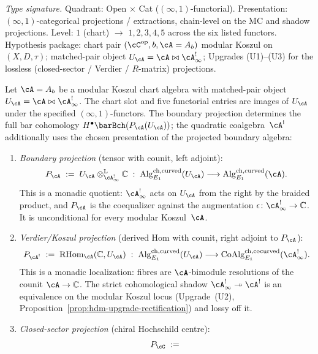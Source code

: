 \begin{theorem}
\label{thm:hdm-five-recovery-functors}
\emph{Type signature.} Quadrant: Open $\times$ Cat
($(\infty,1)$-functorial). Presentation: $(\infty,1)$-categorical
projections / extractions, chain-level on the MC and shadow
projections. Level: $1$ (chart) $\to$ $1, 2, 3, 4, 5$ across the six
listed functors. Hypothesis package: chart pair
$(\cC^{\mathrm{op}}, b, \cA = A_b)$ modular Koszul on $(X, D, \tau)$;
matched-pair object $U_\cA = \cA\bowtie\cA^!_\infty$; Upgrades
\textup{(U1)--(U3)} for the lossless (closed-sector / Verdier /
$R$-matrix) projections.

Let $\cA = A_b$ be a modular Koszul chart algebra with matched-pair
object $U_\cA=\cA\bowtie\cA^!_\infty$. The chart slot and five
functorial entries are images of $U_\cA$ under the specified
$(\infty,1)$-functors.  The boundary projection determines the full
bar cohomology $H^\bullet\barBch(P_\cA(U_\cA))$; the quadratic
coalgebra~$\cA^{\mathrm i}$ additionally uses the chosen presentation
of the projected boundary algebra:
\begin{enumerate}[label=\textup{(P\arabic*)}]
\item \emph{Boundary projection} (tensor with counit, left adjoint):
\[
P_\cA\;:=\;U_\cA\otimes^{\mathbb L}_{\cA^!_\infty}\mathbb C
\;:\;\mathrm{Alg}_{E_1}^{\mathrm{ch,curved}}(U_\cA)\longrightarrow
\mathrm{Alg}_{E_1}^{\mathrm{ch,curved}}(\cA).
\]
This is a monadic quotient: $\cA^!_\infty$ acts on $U_\cA$ from the
right by the braided product, and $P_\cA$ is the coequalizer against
the augmentation $\epsilon\colon \cA^!_\infty\to\mathbb C$. It is
unconditional for every modular Koszul~$\cA$.
\item \emph{Verdier/Koszul projection} (derived Hom with counit, right
adjoint to $P_\cA$):
\[
P_{\cA^!}\;:=\;\mathrm{RHom}_{\cA}(\mathbb C,U_\cA)
\;:\;\mathrm{Alg}_{E_1}^{\mathrm{ch,curved}}(U_\cA)\longrightarrow
\mathrm{CoAlg}_{E_1}^{\mathrm{ch,cocurved}}(\cA^!_\infty).
\]
This is a monadic localization: fibres are $\cA$-bimodule resolutions
of the counit $\cA\to\mathbb C$. The strict cohomological shadow
$\cA^!_\infty\twoheadrightarrow\cA^!$ is an equivalence on the
modular Koszul locus (Upgrade~(U2),
Proposition~\ref{prop:hdm-upgrade-rectification}) and
lossy off it.
\item \emph{Closed-sector projection} (chiral Hochschild centre):
\[
P_\cC\;:=\;
\]
\end{enumerate}
\end{theorem}

